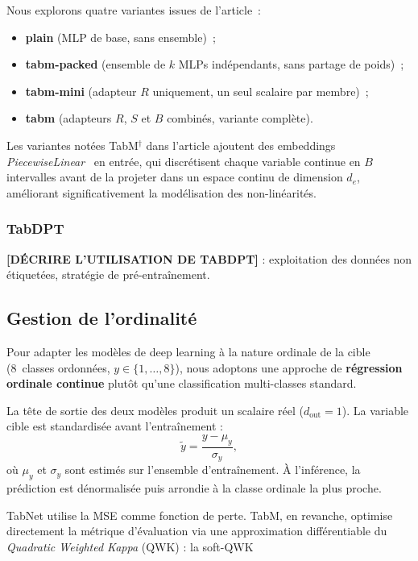 \documentclass[conference]{IEEEtran}
\begin{document}
Nous explorons quatre variantes issues de l'article~:
\begin{itemize}
  \item \textbf{plain} (MLP de base, sans ensemble)~;
  \item \textbf{tabm-packed} (ensemble de $k$ MLPs indépendants, sans partage de poids)~;
  \item \textbf{tabm-mini} (adapteur $R$ uniquement, un seul scalaire par membre)~;
  \item \textbf{tabm} (adapteurs $R$, $S$ et $B$ combinés, variante complète).
\end{itemize}

Les variantes notées TabM$^\dagger$ dans l'article ajoutent des embeddings
\textit{PiecewiseLinear}~\cite{gorishniy2022embeddings} en entrée, qui discrétisent chaque
variable continue en $B$ intervalles avant de la projeter dans un espace continu de
dimension $d_e$, améliorant significativement la modélisation des non-linéarités.

\subsubsection{TabDPT}
\textbf{[DÉCRIRE L'UTILISATION DE TABDPT]} : exploitation des données non étiquetées,
stratégie de pré-entraînement.

\subsection{Gestion de l'ordinalité}

Pour adapter les modèles de deep learning à la nature ordinale de la cible
(8~classes ordonnées, $y \in \{1, \ldots, 8\}$), nous adoptons une
approche de \textbf{régression ordinale continue} plutôt qu'une classification multi-classes standard.


La tête de sortie des deux modèles produit un scalaire réel ($d_{\text{out}}=1$).
La variable cible est standardisée avant l'entraînement :
\begin{equation}
  \tilde{y} = \frac{y - \mu_y}{\sigma_y},
\end{equation}
où $\mu_y$ et $\sigma_y$ sont estimés sur l'ensemble d'entraînement. 
À l'inférence, la prédiction est dénormalisée puis arrondie à la classe ordinale
la plus proche.
 
TabNet utilise la MSE comme fonction de perte. TabM, en revanche,
optimise directement la métrique d'évaluation via une approximation
différentiable du \textit{Quadratic Weighted Kappa} (QWK) : la soft-QWK
 
\end{document}
